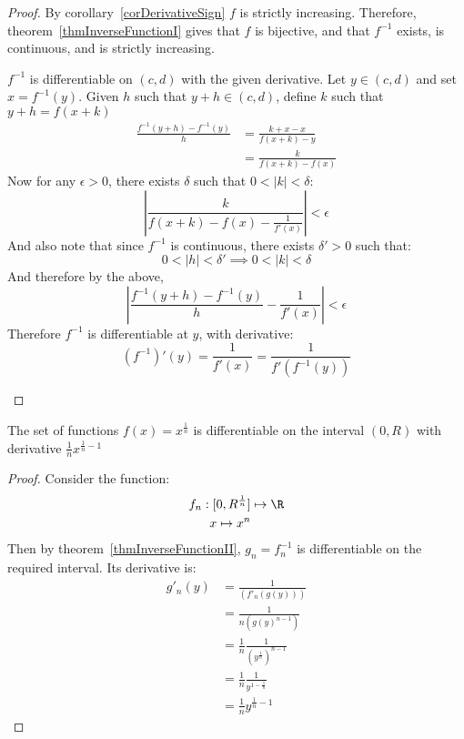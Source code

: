\documentclass[../Main.tex]{subfiles}
\begin{document}
\begin{proof}
    By corollary~\ref{corDerivativeSign} $f$ is strictly increasing. Therefore, theorem~\ref{thmInverseFunctionI} gives that $f$ is bijective, and that $f^{-1}$ exists, is continuous, and is strictly increasing.
    \begin{subproof}{$f^{-1}$ is differentiable on $(c, d)$ with the given derivative.}
        Let $y \in (c, d)$ and set $x = f^{-1}(y)$. Given $h$ such that $y + h \in (c, d)$, define $k$ such that $y + h = f(x + k)$
        \begin{align*}
            \frac{f^{-1}(y + h) - f^{-1}(y)}{h} &= \frac{k + x - x}{f(x + k) - y} \\
            &= \frac{k}{f(x + k) - f(x)}
        \end{align*}
        Now for any $\epsilon > 0$, there exists $\delta$ such that $0 < |k| < \delta$:
        \begin{equation*}
            \left|\frac{k}{f(x + k) - f(x) - \frac{1}{f'(x)}}\right| < \epsilon
        \end{equation*}
        And also note that since $f^{-1}$ is continuous, there exists $\delta' > 0$ such that:
        \begin{equation*}
            0 < |h| < \delta' \implies 0 < |k| < \delta
        \end{equation*}
        And therefore by the above,
        \begin{equation*}
            \left|\frac{f^{-1}(y + h) - f^{-1}(y)}{h} - \frac{1}{f'(x)}\right| < \epsilon
        \end{equation*}
        Therefore $f^{-1}$ is differentiable at $y$, with derivative:
        \begin{equation*}
            (f^{-1})'(y) = \frac{1}{f'(x)} = \frac{1}{f'(f^{-1}(y))}
        \end{equation*}
    \end{subproof}
\end{proof}
\begin{corollary}
    The set of functions $f(x) = x^{\frac{1}{n}}$ is differentiable on the interval $(0, R)$ with derivative $\frac{1}{n} x^{\frac{1}{n} - 1}$
    \label{corNthRootDiffable}
\end{corollary}
\begin{proof}
    Consider the function:
    \begin{align*}
        f_n : [0, R^{\frac{1}{n}}] &\mapsto \R \\
        x \mapsto x^n
    \end{align*}
    Then by theorem~\ref{thmInverseFunctionII}, $g_n = f_n^{-1}$ is differentiable on the required interval. Its derivative is:
    \begin{align*}
        g'_n(y) &= \frac{1}{(f'_n(g(y)))} \\
        &= \frac{1}{n (g(y)^{n-1})} \\
        &= \frac{1}{n}\frac{1}{(y^{\frac{1}{n}})^{n-1}} \\
        &= \frac{1}{n}\frac{1}{y^{1 - \frac{1}{n}}} \\
        &= \frac{1}{n} y^{\frac{1}{n} - 1}
    \end{align*}
\end{proof}
\end{document}
